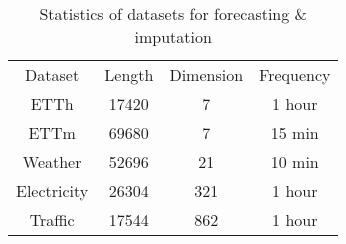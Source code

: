 \begin{table*}[]
\centering
\caption{Statistics of datasets for forecasting \& imputation}
\label{table:datasets for forecasting and Imputation}
\small  %
\setlength{\tabcolsep}{4pt} %
\renewcommand{\arraystretch}{0.8} %
\begin{tabular}{c|c|c|c}
\toprule
Dataset & Length & Dimension & Frequency \\
ETTh & 17420 & 7 & 1 hour \\
ETTm & 69680 & 7 & 15 min \\
Weather & 52696 & 21 & 10 min \\
Electricity & 26304 & 321 & 1 hour \\
Traffic & 17544 & 862 & 1 hour  \\ 
            \bottomrule
\end{tabular}
\end{table*}